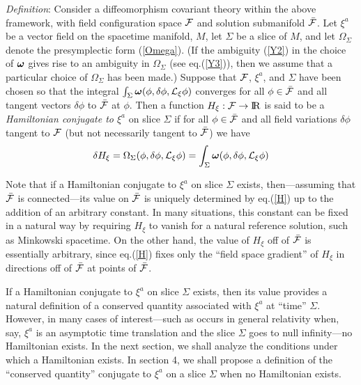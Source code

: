 \medskip

\noindent
{\it Definition}: Consider a diffeomorphism covariant theory within
the above framework, with field configuration space ${\cal F}$ and
solution submanifold $\bar{\cal F}$.  Let $\xi^a$ be a vector field on
the spacetime manifold, $M$, let $\Sigma$ be a slice of $M$, and let
$\Omega_\Sigma$ denote the presymplectic form (\ref{Omega}). (If the
ambiguity (\ref{Y2}) in the choice of ${\mbox{\boldmath $\omega$}}$
gives rise to an ambiguity in $\Omega_\Sigma$ (see eq.(\ref{Y3})),
then we assume that a particular choice of $\Omega_\Sigma$ has been
made.)  Suppose that ${\cal F}$, $\xi^a$, and $\Sigma$ have been
chosen so that the integral $\int_\Sigma {\mbox{\boldmath
$\omega$}}(\phi, \delta \phi, {\cal L}_\xi \phi)$
converges for all $\phi \in \bar{\cal F}$ and all tangent vectors
$\delta \phi$ to $\bar{\cal F}$ at $\phi$. Then a function $H_\xi :
{\cal F} \rightarrow {\rm I} \! {\rm R}$ is said to be a {\em
Hamiltonian conjugate to $\xi^a$} on slice $\Sigma$ if for all $\phi
\in \bar{\cal F}$ and all field variations $\delta \phi$ tangent to
$\cal F$ (but not necessarily tangent to $\bar{\cal F}$) we have
\begin{equation}
\delta H_\xi = \Omega_\Sigma(\phi, \delta \phi, {\cal L}_\xi \phi) =
\int_\Sigma
{\mbox{\boldmath $\omega$}}(\phi, \delta \phi, {\cal L}_\xi \phi)
\label{H}
\end{equation}

\medskip

Note that if a Hamiltonian conjugate to $\xi^a$ on slice $\Sigma$
exists, then---assuming that $\bar{\cal F}$ is connected---its value
on $\bar{\cal F}$ is uniquely determined by eq.(\ref{H}) up to the
addition of an arbitrary constant. In many situations, this constant
can be fixed in a natural way by requiring $H_\xi$ to vanish for a
natural reference solution, such as Minkowski spacetime. On the other
hand, the value of $H_\xi$ off of $\bar{\cal F}$ is essentially
arbitrary, since eq.(\ref{H}) fixes only the ``field space gradient''
of $H_\xi$ in directions off of $\bar{\cal F}$ at points of $\bar{\cal
F}$.

If a Hamiltonian conjugate to $\xi^a$ on slice $\Sigma$ exists, then
its value provides a natural definition of a conserved quantity
associated with $\xi^a$ at ``time'' $\Sigma$. However, in many cases
of interest---such as occurs in general relativity when, say, $\xi^a$
is an asymptotic time translation and the slice $\Sigma$ goes to null
infinity---no Hamiltonian exists. In the next section, we shall
analyze the conditions under which a Hamiltonian exists. In
section 4, we shall propose a definition of the ``conserved
quantity'' conjugate to $\xi^a$ on a slice $\Sigma$ when no Hamiltonian
exists.


